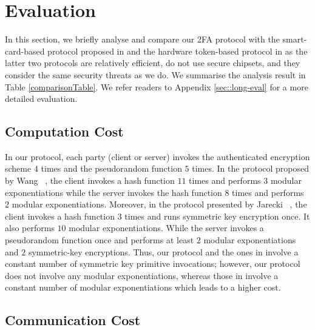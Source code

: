 
\section{Evaluation}\label{sec::eval}

In this section, we briefly analyse and compare our 2FA protocol with the smart-card-based protocol proposed in  \cite{WangW18} and the hardware token-based protocol in \cite{JareckiJKSS21} as the latter two protocols are relatively efficient, do not use secure chipsets, and they consider the same security threats as we do. We summarise the analysis result in Table \ref{comparisonTable}. We refer readers to Appendix \ref{sec::long-eval} for a more detailed evaluation. 







\subsection{Computation Cost}

In our protocol, each party (client or server) invokes the authenticated encryption scheme $4$ times and the pseudorandom function $5$ times. In the protocol proposed by Wang \etal~\cite{WangW18}, the client invokes a hash function $11$ times and performs $3$ modular exponentiations while the server invokes the hash function $8$ times and performs $2$ modular exponentiations. Moreover, in the protocol presented by Jarecki \etal~\cite{JareckiJKSS21}, the client invokes a hash function $3$ times and runs symmetric key encryption once. It also performs $10$ modular exponentiations. While the server invokes a pseudorandom function once and performs at least $2$ modular exponentiations and $2$ symmetric-key encryptions. Thus,  our protocol and the ones in \cite{WangW18,JareckiJKSS21} involve a constant number of symmetric key primitive invocations; however, our protocol does not involve any modular exponentiations, whereas those in  \cite{WangW18,JareckiJKSS21} involve a constant number of modular exponentiations which leads to a higher cost. 

\subsection{Communication Cost}

